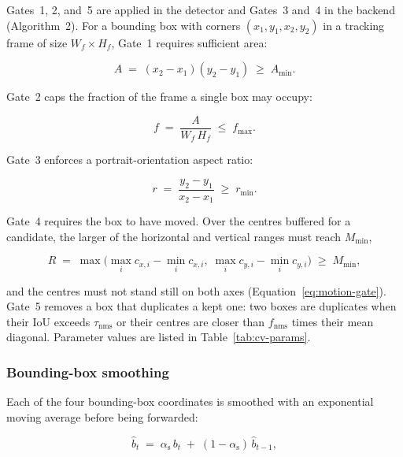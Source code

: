 Gates~1, 2, and~5 are applied in the detector and Gates~3 and~4 in the
backend (Algorithm~2). For a bounding box with corners
$(x_1, y_1, x_2, y_2)$ in a tracking frame of size $W_f \times H_f$,
Gate~1 requires sufficient area:

\begin{equation}
A \;=\; (x_2 - x_1)(y_2 - y_1) \;\geq\; A_{\min}.
\label{eq:gate1}
\end{equation}

\noindent Gate~2 caps the fraction of the frame a single box may occupy:

\begin{equation}
f \;=\; \frac{A}{W_f \, H_f} \;\leq\; f_{\max}.
\end{equation}

\noindent Gate~3 enforces a portrait-orientation aspect ratio:

\begin{equation}
r \;=\; \frac{y_2 - y_1}{x_2 - x_1} \;\geq\; r_{\min}.
\end{equation}

\noindent Gate~4 requires the box to have moved. Over the centres
buffered for a candidate, the larger of the horizontal and vertical
ranges must reach $M_{\min}$,

\begin{equation}
R \;=\; \max\!\big(\max_i c_{x,i} - \min_i c_{x,i},\;
\max_i c_{y,i} - \min_i c_{y,i}\big) \;\geq\; M_{\min},
\label{eq:motion}
\end{equation}

\noindent and the centres must not stand still on both axes
(Equation~\ref{eq:motion-gate}). Gate~5 removes a box that duplicates
a kept one: two boxes are duplicates when their IoU exceeds
$\tau_{\mathrm{nms}}$ or their centres are closer than
$f_{\mathrm{nms}}$ times their mean diagonal. Parameter values are
listed in Table~\ref{tab:cv-params}.

\subsubsection{Bounding-box smoothing}

Each of the four bounding-box coordinates is smoothed with an
exponential moving average before being forwarded:

\begin{equation}
\hat{b}_t \;=\; \alpha_{\mathrm{s}}\, b_t \;+\; (1 - \alpha_{\mathrm{s}})\, \hat{b}_{t-1},
\label{eq:ema-bbox}
\end{equation}

